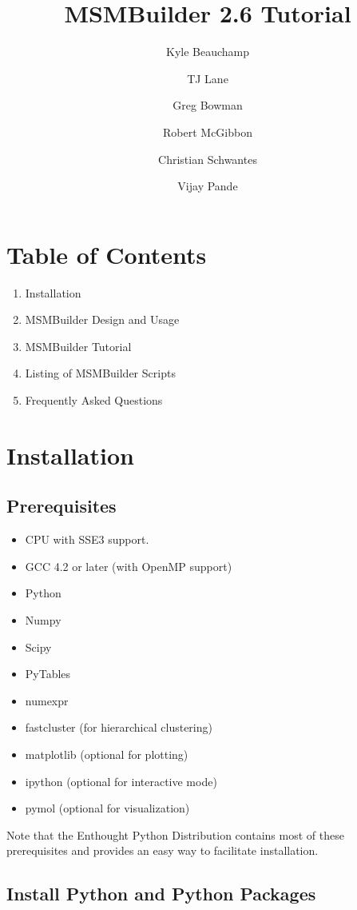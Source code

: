 \documentclass[12pt]{article}
\title
{MSMBuilder 2.6 Tutorial
}
\author{Kyle Beauchamp \and TJ Lane \and Greg Bowman \and  Robert McGibbon \and Christian Schwantes \and Vijay Pande}
\begin{document}
\maketitle

\section{Table of Contents}
\begin{enumerate}
\item Installation
\item MSMBuilder Design and Usage
\item MSMBuilder Tutorial
\item Listing of MSMBuilder Scripts
\item Frequently Asked Questions
\end{enumerate}

\newpage

\section{Installation}

\subsection{Prerequisites}
\begin{itemize}
\item CPU with SSE3 support.
\item GCC 4.2 or later (with OpenMP support)
\item Python
\item Numpy
\item Scipy
\item PyTables
\item numexpr
\item fastcluster (for hierarchical clustering)
\item matplotlib (optional for plotting)
\item ipython (optional for interactive mode)
\item pymol (optional for visualization)
\end{itemize}
Note that the Enthought Python Distribution contains most of these prerequisites and provides an easy way to facilitate installation.

\subsection{Install Python and Python Packages}
\end{document}
